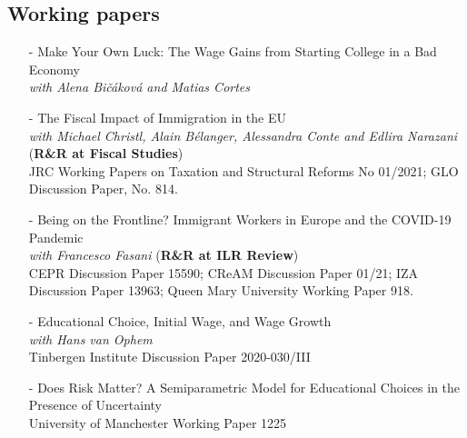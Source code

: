 \documentclass[11pt]{article}
\begin{document}
\nocite{mazza_scipioni_jepp}
\nocite{bicakova_cortes_mazza_ej}
\nocite{mazza_vohpem_hartog_le}
\nocite{mazza_vophem_jrssa}

\hspace*{20pt}%
\begin{minipage}[t]{0.9\textwidth}%
\vspace{-.9cm}
    \centering
    \renewcommand\refname{}
        
        
\end{minipage}

\vspace{-.3cm}

\subsection*{\sc Working papers}

\begin{itemize}[itemsep=0pt, leftmargin=20pt]
\item [-]{Make Your Own Luck: The Wage Gains from Starting College in a Bad Economy}\\
\emph{with Alena Bi\v{c}\'{a}kov\'{a} and Matias Cortes}
\item [-]The Fiscal Impact of Immigration in the EU\\
\emph{with Michael Christl, Alain Bélanger, Alessandra Conte and Edlira Narazani} (\textbf{R\&R at Fiscal Studies}) \\
JRC Working Papers on Taxation and Structural Reforms No 01/2021; GLO Discussion Paper, No. 814.
\item [-]Being on the Frontline? Immigrant Workers in Europe and the COVID-19 Pandemic\\
\emph{with Francesco Fasani} (\textbf{R\&R at ILR Review})\\
CEPR Discussion Paper 15590; CReAM Discussion Paper 01/21; IZA Discussion Paper 13963; Queen Mary University Working Paper 918.
\item [-]Educational Choice, Initial Wage, and Wage Growth\\
\emph{with Hans van Ophem}\\
Tinbergen Institute Discussion Paper 2020-030/III
\item [-]Does Risk Matter? A Semiparametric Model for Educational Choices in the Presence of Uncertainty \\
University of Manchester Working Paper 1225

\end{itemize}
\end{document}
